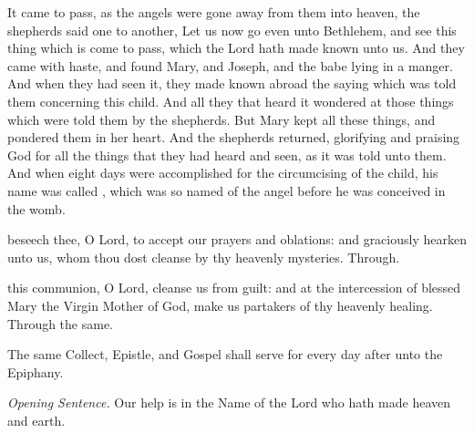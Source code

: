  It came to pass, as the angels were gone away from them into heaven, the shepherds said one to another, Let us now go even unto Bethlehem, and see this thing which is come to pass, which the Lord hath made known unto us. And they came with haste, and found Mary, and Joseph, and the babe lying in a manger. And when they had seen it, they made known abroad the saying which was told them concerning this child. And all they that heard it wondered at those things which were told them by the shepherds. But Mary kept all these things, and pondered them in her heart. And the shepherds returned, glorifying and praising God for all the things that they had heard and seen, as it was told unto them. And when eight days were accomplished for the circumcising of the child, his name was called , which was so named of the angel before he was conceived in the womb.


\vspace{-0.3\baselineskip}

\secret

\vspace{-0.4\baselineskip}

 beseech thee, O Lord, to accept our prayers and oblations: and graciously hearken unto us, whom thou dost cleanse by thy heavenly mysteries. Through.


\vspace{-0.3\baselineskip}

\postcommunion

\vspace{-0.3\baselineskip}

 this communion, O Lord, cleanse us from guilt: and at the intercession of blessed Mary the Virgin Mother of God, make us partakers of thy heavenly healing. Through the same.

\begin{rubric}
    The same Collect, Epistle, and Gospel shall serve for every day after unto the Epiphany.
\end{rubric}


\clearpage
{}\label{MostHolyName}
\par\noindent
\textit{Opening Sentence.} Our help is in the Name of the Lord who hath made heaven and earth.

